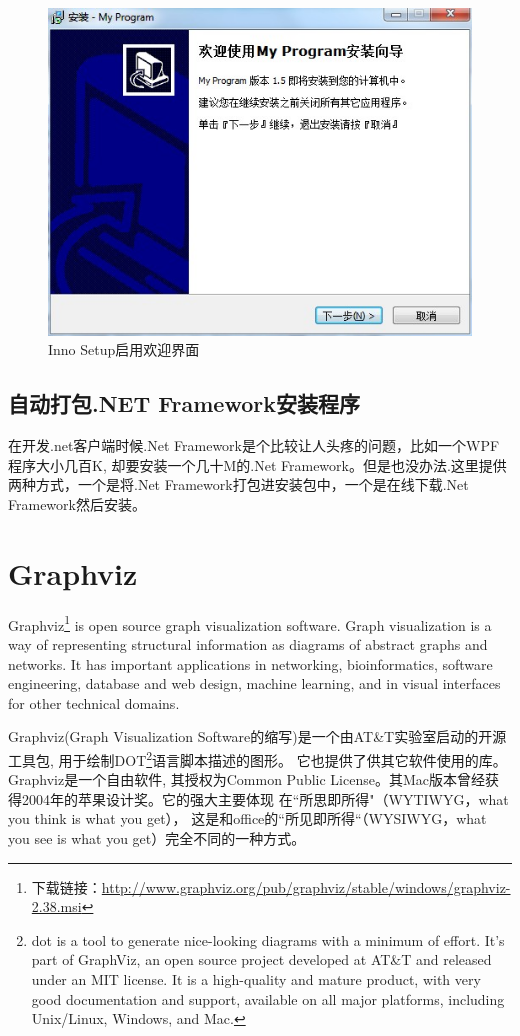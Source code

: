\documentclass{book}
\begin{document}
\begin{figure}[htbp]
	\centering
	\includegraphics[scale=0.8]{InnoSetupEnableWelcomePage.jpg}
	\caption{Inno Setup启用欢迎界面}
	\label{fig:InnoSetupEnableWelcomePage}
\end{figure}



\subsection{自动打包.NET Framework安装程序}

在开发.net客户端时候.Net Framework是个比较让人头疼的问题，比如一个WPF程序大小几百K,
却要安装一个几十M的.Net Framework。但是也没办法.这里提供两种方式，一个是将.Net Framework打包进安装包中，一个是在线下载.Net Framework然后安装。

\section{Graphviz}

Graphviz\footnote{下载链接：\url{http://www.graphviz.org/pub/graphviz/stable/windows/graphviz-2.38.msi}} is open source graph visualization software. 
Graph visualization is a way of representing structural 
information as diagrams of abstract graphs and networks. 
It has important applications in networking, bioinformatics,
software engineering, database and web design, 
machine learning, and in visual interfaces for other technical domains.

Graphviz(Graph Visualization Software的缩写)是一个由AT\&T实验室启动的开源工具包,
用于绘制DOT\footnote{dot is a tool to generate nice-looking diagrams 
with a minimum of effort. It's part of GraphViz, 
an open source project developed at AT\&T and 
released under an MIT license. It is a high-quality 
and mature product, with very good documentation and 
support, available on all major platforms, 
including Unix/Linux, Windows, and Mac.}语言脚本描述的图形。
它也提供了供其它软件使用的库。Graphviz是一个自由软件,
其授权为Common Public License。其Mac版本曾经获得2004年的苹果设计奖。它的强大主要体现
在“所思即所得"（WYTIWYG，what you think is what you get），
这是和office的“所见即所得“（WYSIWYG，what you see is what you get）完全不同的一种方式。
\end{document}
